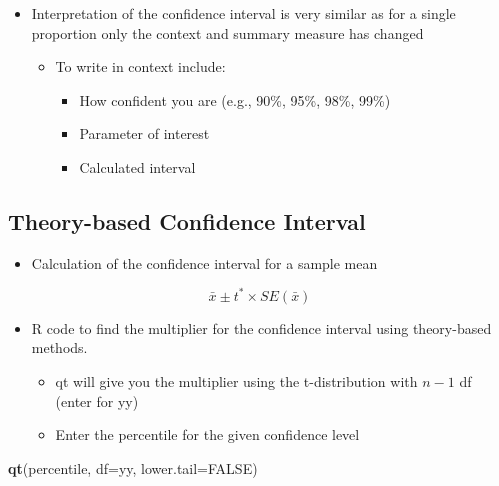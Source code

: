 \documentclass[
]{report}
\newenvironment{Shaded}{\begin{snugshade}}{\end{snugshade}}
\newcommand{\AttributeTok}[1]{\textcolor[rgb]{0.13,0.29,0.53}{#1}}
\newcommand{\ConstantTok}[1]{\textcolor[rgb]{0.56,0.35,0.01}{#1}}
\newcommand{\FunctionTok}[1]{\textcolor[rgb]{0.13,0.29,0.53}{\textbf{#1}}}
\newcommand{\NormalTok}[1]{#1}
\providecommand{\tightlist}{%
  \setlength{\itemsep}{0pt}\setlength{\parskip}{0pt}}
\begin{document}
\begin{itemize}
\item
  Interpretation of the confidence interval is very similar as for a single proportion only the context and summary measure has changed

  \begin{itemize}
  \item
    To write in context include:

    \begin{itemize}
    \item
      How confident you are (e.g., 90\%, 95\%, 98\%, 99\%)
    \item
      Parameter of interest
    \item
      Calculated interval
    \end{itemize}
  \end{itemize}
\end{itemize}

\subsection*{Theory-based Confidence Interval}\label{theory-based-confidence-interval}

\begin{itemize}
\tightlist
\item
  Calculation of the confidence interval for a sample mean
\end{itemize}

\[\bar{x}\pm t^*\times SE(\bar{x})\]

\begin{itemize}
\item
  R code to find the multiplier for the confidence interval using theory-based methods.

  \begin{itemize}
  \item
    qt will give you the multiplier using the t-distribution with \(n-1\) df (enter for yy)
  \item
    Enter the percentile for the given confidence level
  \end{itemize}
\end{itemize}

\begin{Shaded}
\begin{Highlighting}[]
\FunctionTok{qt}\NormalTok{(percentile, }\AttributeTok{df=}\NormalTok{yy, }\AttributeTok{lower.tail=}\ConstantTok{FALSE}\NormalTok{)}
\end{Highlighting}
\end{Shaded}
\end{document}

